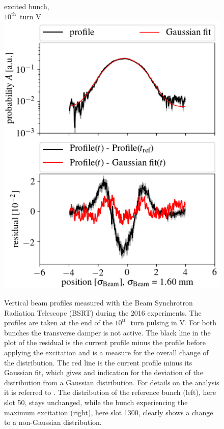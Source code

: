 \documentclass[%
 reprint,
 amsmath,amssymb,
 aps,
prstab,
]{revtex4-1}
\begin{document}
\begin{figure}[h]
\begin{minipage}[t]{0.49\linewidth}
		excited bunch,\\ $10^{\mathrm{th}}$~turn V		\includegraphics[width=1.0\linewidth]{profile_v_10thv_slot_1300.png}
	\end{minipage}
	\caption{\label{fig:10thexpprof} Vertical beam profiles measured with the Beam Synchrotron Radiation Telescope (BSRT) during the 2016 experiments. The profiles are taken at the end of the $10^{\mathrm{th}}$~turn pulsing in V. For both bunches the transverse damper is not active. The black line in the plot of the residual is the current profile minus the profile before applying the excitation and is a measure for the overall change of the distribution. The red line is the current profile minus its Gaussian fit, which gives and indication for the deviation of the distribution from a Gaussian distribution. For details on the analysis it is referred to \cite{bsrtprofinj}. The distribution of the reference bunch (left), here slot 50, stays unchanged, while the bunch experiencing the maximum excitation (right), here slot 1300, clearly shows a change to a non-Gaussian distribution.}
\end{figure}
\end{document}
